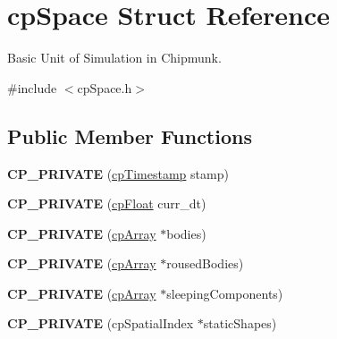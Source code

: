 \hypertarget{structcp_space}{\section{cp\-Space Struct Reference}
\label{structcp_space}
}


Basic Unit of Simulation in Chipmunk.  




{\ttfamily \#include $<$cp\-Space.\-h$>$}

\subsection*{Public Member Functions}
\begin{DoxyCompactItemize}
\item 
\hypertarget{structcp_space_adfa4ce28c4357ef54a9e61b605e45457}{{\bfseries C\-P\-\_\-\-P\-R\-I\-V\-A\-T\-E} (\hyperlink{group__basic_types_gaa24652c104082d0725066ea5ac7dc83f}{cp\-Timestamp} stamp)}\label{structcp_space_adfa4ce28c4357ef54a9e61b605e45457}

\item 
\hypertarget{structcp_space_a8531345195a8715baeb3f64ab8c3b689}{{\bfseries C\-P\-\_\-\-P\-R\-I\-V\-A\-T\-E} (\hyperlink{group__basic_types_gac1ed65573e035bf892505768c852d8d3}{cp\-Float} curr\-\_\-dt)}\label{structcp_space_a8531345195a8715baeb3f64ab8c3b689}

\item 
\hypertarget{structcp_space_a806c2fcdef835e5c95d17f0348c56b22}{{\bfseries C\-P\-\_\-\-P\-R\-I\-V\-A\-T\-E} (\hyperlink{structcp_array}{cp\-Array} $\ast$bodies)}\label{structcp_space_a806c2fcdef835e5c95d17f0348c56b22}

\item 
\hypertarget{structcp_space_a45efefe0c3b166ea0e3f3640d48b9117}{{\bfseries C\-P\-\_\-\-P\-R\-I\-V\-A\-T\-E} (\hyperlink{structcp_array}{cp\-Array} $\ast$roused\-Bodies)}\label{structcp_space_a45efefe0c3b166ea0e3f3640d48b9117}

\item 
\hypertarget{structcp_space_a9a02917a023511cb2918f94010757d6b}{{\bfseries C\-P\-\_\-\-P\-R\-I\-V\-A\-T\-E} (\hyperlink{structcp_array}{cp\-Array} $\ast$sleeping\-Components)}\label{structcp_space_a9a02917a023511cb2918f94010757d6b}

\item 
\hypertarget{structcp_space_accb3105ff3a2abd0d6dcb21d4b757846}{{\bfseries C\-P\-\_\-\-P\-R\-I\-V\-A\-T\-E} (cp\-Spatial\-Index $\ast$static\-Shapes)}\label{structcp_space_accb3105ff3a2abd0d6dcb21d4b757846}


\end{DoxyCompactItemize}
